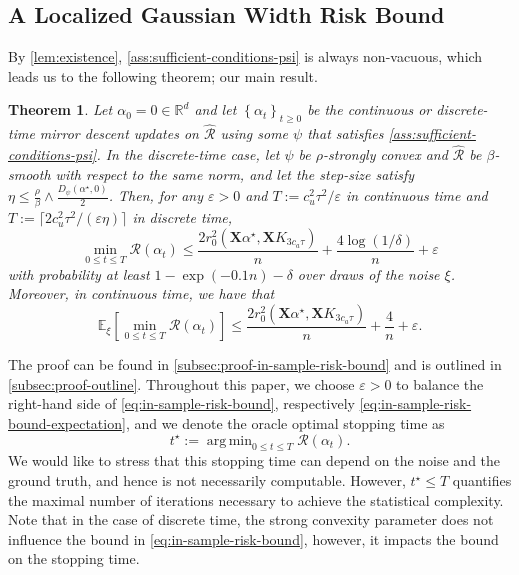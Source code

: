 \documentclass[a4paper]{article}
\newcommand{\mathset}[1]{\left\{#1\right\}}
\newcommand{\br}[1]{\left[#1\right]}
\newcommand{\X}[0]{\mathbf{X}}
\newcommand{\EE}[0]{\mathbb{E}}
\newcommand{\RR}[0]{\mathbb{R}}
\newcommand{\cR}[0]{\mathcal{R}}
\newcommand{\eps}[0]{\varepsilon}
\newcommand{\tstar}{t^\star}
\newcommand{\alphastar}{\alpha^\star}
\newcommand{\alphat}[0]{\alpha_t}
\newcommand{\rzero}[0]{r_{0}}
\DeclareMathOperator*{\argmin}{arg\,min}
\newcommand{\Rhat}[0]{\widehat{\cR}}
\theoremstyle{thmstyle}
\newtheorem{theorem}{Theorem}
\theoremstyle{defstyle}
\theoremstyle{remark}
\begin{document}
\subsection{A Localized Gaussian Width Risk Bound}
By \cref{lem:existence}, \cref{ass:sufficient-conditions-psi} is always non-vacuous, which leads us to the following theorem; our main result.
\begin{theorem}
\label{thm:in-sample-risk-bound}
    Let $\alpha_0=0\in\RR^d$ and let $\mathset{\alphat}_{t\geq 0}$ be the continuous or discrete-time mirror descent updates on $\Rhat$ using some $\psi$ that satisfies \cref{ass:sufficient-conditions-psi}.
    In the discrete-time case, let $\psi$ be $\rho$-strongly convex and $\Rhat$ be $\beta$-smooth with respect to the same norm, and let the step-size satisfy
    $\eta\leq \frac{\rho}{\beta}\wedge\frac{D_{\psi}(\alphastar,0)}{2}$.
    Then, for any $\eps>0$ and $T:=c_u^2\tau^2 /\eps$ in continuous time and $T:= \lceil 2c_u^2\tau^2 /(\eps\eta)\rceil$
    in discrete time,
    \begin{equation}
    \label{eq:in-sample-risk-bound}
        \min_{0\leq t\leq T}\cR(\alphat)\leq  \frac{2\rzero^2(\X\alphastar,\X K_{3c_a\tau})}{n}+\frac{4\log(1/\delta)}{n}+\eps
    \end{equation}
    with probability at least $1-\exp(-0.1 n)-\delta$ over draws of the noise $\xi$. Moreover, in continuous time, we have that
    \begin{equation}
    \label{eq:in-sample-risk-bound-expectation}
        \EE_\xi\br{\min_{0\leq t\leq T} \cR(\alphat)}\leq  \frac{2\rzero^2(\X\alphastar,\X K_{3c_a\tau})}{n}+\frac{4}{n}+\eps.
    \end{equation}
\end{theorem}
\noindent The proof can be found in \cref{subsec:proof-in-sample-risk-bound} and is outlined in \cref{subsec:proof-outline}. Throughout this paper, we choose $\eps>0$ to balance the right-hand side of \eqref{eq:in-sample-risk-bound}, respectively \eqref{eq:in-sample-risk-bound-expectation}, and we denote the oracle optimal stopping time as
\begin{equation*}
    \tstar:= \argmin_{0\leq t\leq T}\cR(\alphat).
\end{equation*}
We would like to stress that this stopping time can depend on the noise and the ground truth, and hence is not necessarily computable. However, $\tstar\leq T$ quantifies the maximal number of iterations necessary to achieve the statistical complexity. Note that in the case of discrete time, the strong convexity parameter does not influence the bound in \eqref{eq:in-sample-risk-bound}, however, it impacts the bound on the stopping time.
\end{document}
